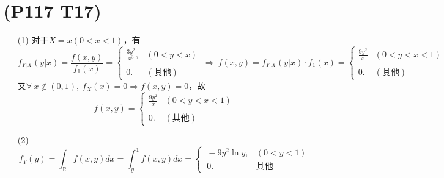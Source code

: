 \documentclass{article}
\begin{document}
\section{(P117 T17)}  %
\begin{enumerate}
    \item [(1)]对于$X=x(0<x<1)$，有
    \[
        f_{Y|X}(y|x) =  
        \displaystyle{\frac{f(x,y)}{f_1(x)}}=
        \begin{cases}
            \displaystyle{\frac{3y^2}{x^3}},     & (0<y<x)\\
            \\
            0.   &(\mbox{其他})
        \end{cases} 
        \ \Rightarrow\ 
        f(x,y)= f_{Y|X}(y|x) \cdot f_1(x) =  
        \begin{cases}
            \displaystyle{\frac{9y^2}{x}} & (0<y<x<1)\\
            \\
            0.  & (\mbox{其他})
        \end{cases}
    \]
    又$\forall\ x\notin (0,1),\ f_{X}(x) = 0 \Rightarrow f(x,y)=0$，故
    \[
        f(x,y)=   
        \begin{cases}
            \displaystyle{\frac{9y^2}{x}} & (0<y<x<1)\\
            \\
            0.  & (\mbox{其他})
        \end{cases}
    \]
    \item [(2)]
    \[
        f_{Y} (y)=
        \int_{\mathbb{R}} f(x,y) dx =
        \int_{y}^{1} f(x,y) dx = 
        \begin{cases}
            \ -9y^2 \ln{y},   &(0<y<1)\\
            \ 0.  &\mbox{其他}    
        \end{cases}
    \]
\end{enumerate}
\end{document}
